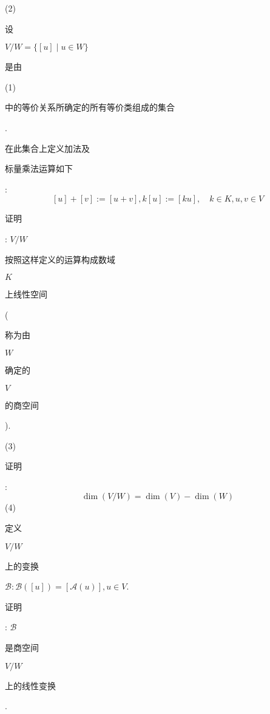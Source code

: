 \documentclass[10pt]{article}
\begin{document}
(2) \begin{CJK}{UTF8}{mj}设\end{CJK} $V / W=\{[u] \mid u \in W\}$ \begin{CJK}{UTF8}{mj}是由\end{CJK} (1) \begin{CJK}{UTF8}{mj}中的等价关系所确定的所有等价类组成的集合\end{CJK}. \begin{CJK}{UTF8}{mj}在此集合上定义加法及\end{CJK} \begin{CJK}{UTF8}{mj}标量乘法运算如下\end{CJK}:
$$
[u]+[v]:=[u+v], k[u]:=[k u], \quad k \in K, u, v \in V
$$
\begin{CJK}{UTF8}{mj}证明\end{CJK}: $V / W$ \begin{CJK}{UTF8}{mj}按照这样定义的运算构成数域\end{CJK} $K$ \begin{CJK}{UTF8}{mj}上线性空间\end{CJK}(\begin{CJK}{UTF8}{mj}称为由\end{CJK} $W$ \begin{CJK}{UTF8}{mj}确定的\end{CJK} $V$ \begin{CJK}{UTF8}{mj}的商空间\end{CJK}).

(3) \begin{CJK}{UTF8}{mj}证明\end{CJK}:
$$
\operatorname{dim}(V / W)=\operatorname{dim}(V)-\operatorname{dim}(W)
$$
(4) \begin{CJK}{UTF8}{mj}定义\end{CJK} $V / W$ \begin{CJK}{UTF8}{mj}上的变换\end{CJK} $\mathcal{B}: \mathcal{B}([u])=[\mathcal{A}(u)], u \in V$. \begin{CJK}{UTF8}{mj}证明\end{CJK}: $\mathcal{B}$ \begin{CJK}{UTF8}{mj}是商空间\end{CJK} $V / W$ \begin{CJK}{UTF8}{mj}上的线性变换\end{CJK}.
\end{document}
